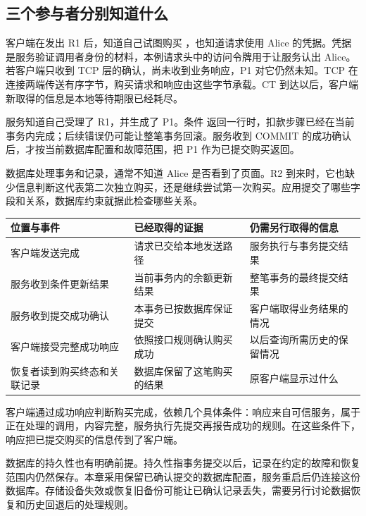 \subsection*{三个参与者分别知道什么}

客户端在发出 R1 后，知道自己试图购买 ，也知道请求使用 Alice 的凭据。凭据是服务验证调用者身份的材料，本例请求头中的访问令牌用于让服务认出 Alice。若客户端只收到 TCP 层的确认，尚未收到业务响应，P1 对它仍然未知。TCP 在连接两端传送有序字节，购买请求和响应由这些字节承载。CT 到达以后，客户端新取得的信息是本地等待期限已经耗尽。

服务知道自己受理了 R1，并生成了 P1。条件  返回一行时，扣款步骤已经在当前事务内完成；后续错误仍可能让整笔事务回滚。服务收到 COMMIT 的成功确认后，才按当前数据库配置和故障范围，把 P1 作为已提交购买返回。

数据库处理事务和记录，通常不知道 Alice 是否看到了页面。R2 到来时，它也缺少信息判断这代表第二次独立购买，还是继续尝试第一次购买。应用提交了哪些字段和关系，数据库约束就据此检查哪些关系。

\begin{center}
\begin{minipage}{\linewidth}
\centering\small\captionsetup{hypcap=false}
\begin{tabularx}{\linewidth}{>{\raggedright\arraybackslash}p{.24\linewidth}XX}
\toprule
\textbf{位置与事件} & \textbf{已经取得的证据} & \textbf{仍需另行取得的信息} \\
\midrule
客户端发送完成 & 请求已交给本地发送路径 & 服务执行与事务提交结果 \\
服务收到条件更新结果 & 当前事务内的余额更新结果 & 整笔事务的最终提交结果 \\
服务收到提交成功确认 & 本事务已按数据库保证提交 & 客户端取得业务结果的情况 \\
客户端接受完整成功响应 & 依照接口规则确认购买成功 & 以后查询所需历史的保留情况 \\
恢复者读到购买终态和关联记录 & 数据库保留了这笔购买的结果 & 原客户端显示过什么 \\
\bottomrule
\end{tabularx}
\end{minipage}
\end{center}

客户端通过成功响应判断购买完成，依赖几个具体条件：响应来自可信服务，属于正在处理的调用，内容完整，服务执行先提交再报告成功的规则。在这些条件下，响应把已提交购买的信息传到了客户端。

数据库的持久性也有明确前提。持久性指事务提交以后，记录在约定的故障和恢复范围内仍然保存。本章采用保留已确认提交的数据库配置，服务重启后仍连接这份数据库。存储设备失效或恢复旧备份可能让已确认记录丢失，需要另行讨论数据恢复和历史回退后的处理规则。

